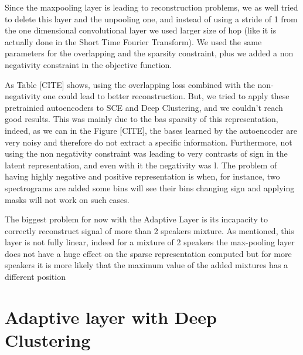 \documentclass[master, tikz, final,11pt, dvipdfmx]{iscs-thesis}
\begin{document}
Since the maxpooling layer is leading to reconstruction problems, we as well tried to delete this layer and the unpooling one, and instead of using a stride of 1 from the one dimensional convolutional layer we used larger size of hop (like it is actually done in the Short Time Fourier Transform). We used the same parameters for the overlapping and the sparsity constraint, plus we added a non negativity constraint in the objective function.

As Table [CITE] shows, using the overlapping loss combined with the non-negativity one could lead to better reconstruction. But, we tried to apply these pretrainied autoencoders to SCE and Deep Clustering, and we couldn't reach good results. This was mainly due to the bas sparsity of this representation, indeed, as we can in the Figure [CITE], the bases learned by the autoencoder are very noisy and therefore do not extract a specific information. Furthermore, not using the non negativity constraint was leading to very contrasts of sign in the latent representation, and even with it the negativity was l. The problem of having highly negative and positive representation is when, for instance, two spectrograms are added some bins will see their bins changing sign and applying masks will not work on such cases.

The biggest problem for now with the Adaptive Layer is its incapacity to correctly reconstruct signal of more than 2 speakers mixture. As mentioned, this layer is not fully linear, indeed for a mixture of 2 speakers the max-pooling layer does not have a huge effect on the sparse representation computed but for more speakers it is more likely that the maximum value of the added mixtures has a different position

\section{Adaptive layer with Deep Clustering}
\end{document}
